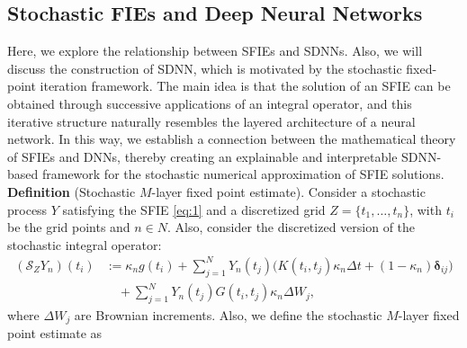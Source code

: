 \documentclass[preprint,12pt,authoryear]{elsarticle}
\begin{document}
\subsection{Stochastic FIEs and Deep Neural Networks}
Here, we explore the relationship between SFIEs and SDNNs. Also, we will discuss the construction of SDNN, which is motivated by the stochastic fixed-point iteration framework. The main idea is that the solution of an SFIE can be obtained through successive applications of an integral operator, and this iterative structure naturally resembles the layered architecture of a neural network. In this way, we establish a connection between the mathematical theory of SFIEs and DNNs, thereby creating an explainable and interpretable SDNN-based framework for the stochastic numerical approximation of SFIE solutions.\\
\textbf{Definition} (Stochastic $M$-layer fixed point estimate).  
Consider a stochastic process $Y$ satisfying the SFIE \eqref{eq:1} and a discretized grid 
$Z = \{t_1,\dots,t_n\}$, with $t_i$ be the grid points and $n\in N$. Also, consider the discretized version of the stochastic integral operator:
\begin{align}
	(\mathcal{S}_Z Y_n)(t_i)
	&:= 
	\kappa_n g(t_i)
	+ \sum_{j=1}^{N} Y_n(t_j)
	\Big(
	K(t_i,t_j)\kappa_n \Delta t
	+ (1-\kappa_n)\mathbf{\delta}_{ij}
	\Big)
	\nonumber \\
	&\quad
	+ \sum_{j=1}^{N}
	Y_n(t_j)
	G(t_i,t_j)\kappa_n \Delta W_j,
	\label{eq:3.1}
\end{align}
where $\Delta W_j$ are Brownian increments. Also, we define the stochastic $M$-layer fixed point estimate as
\end{document}

